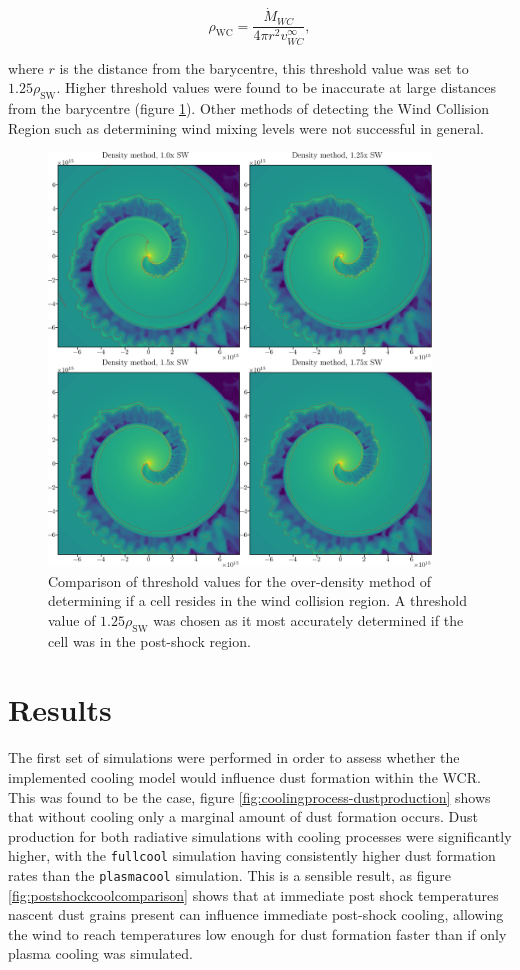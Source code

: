 \documentclass[fleqn,usenatbib]{mnras}
\begin{document}
\begin{equation}
  \rho_\text{WC} = \frac{\dot{M}_{WC}}{4 \pi r^2 v^\infty_{WC}},
\end{equation}

\noindent
where $r$ is the distance from the barycentre, this threshold value was set to $1.25\rho_\text{SW}$.
Higher threshold values were found to be inaccurate at large distances from the barycentre (figure \ref{fig:overdensity-threshold}).
Other methods of detecting the Wind Collision Region such as determining wind mixing levels were not successful in general.

\begin{figure}
  \centering
  \includegraphics[width=4in]{assets/overdensity-method.png}
  \caption[Comparison of threshold values for over-density method]{Comparison of threshold values for the over-density method of determining if a cell resides in the wind collision region.
  A threshold value of $1.25\rho_\text{SW}$ was chosen as it most accurately determined if the cell was in the post-shock region.}
  \label{fig:overdensity-threshold}
\end{figure}

\section{Results}

The first set of simulations were performed in order to assess whether the implemented cooling model would influence dust formation within the WCR.
This was found to be the case, figure \ref{fig:coolingprocess-dustproduction} shows that without cooling only a marginal amount of dust formation occurs.
Dust production for both radiative simulations with cooling processes were significantly higher, with the \texttt{fullcool} simulation having consistently higher dust formation rates than the \texttt{plasmacool} simulation.
This is a sensible result, as figure \ref{fig:postshockcoolcomparison} shows that at immediate post shock temperatures nascent dust grains present can influence immediate post-shock cooling, allowing the wind to reach temperatures low enough for dust formation faster than if only plasma cooling was simulated.
\end{document}
